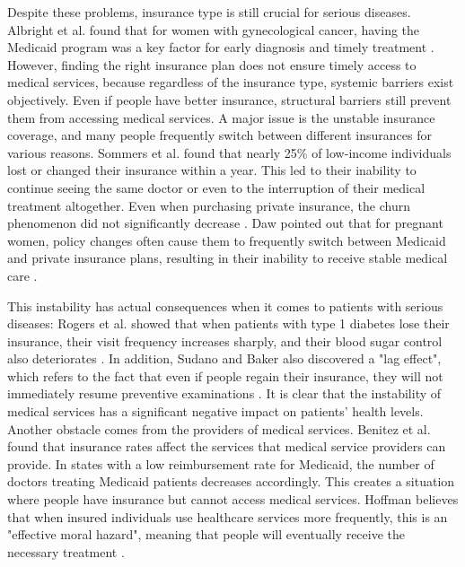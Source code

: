 Despite these problems, insurance type is still crucial for serious diseases. Albright et al. found that for women with gynecological cancer, having the Medicaid program was a key factor for early diagnosis and timely treatment \cite{Albright_Nasioudis_Craig_Moss_Latif_Ko_Haggerty_2021}. However, finding the right insurance plan does not ensure timely access to medical services, because regardless of the insurance type, systemic barriers exist objectively. Even if people have better insurance, structural barriers still prevent them from accessing medical services. A major issue is the unstable insurance coverage, and many people frequently switch between different insurances for various reasons. Sommers et al. found that nearly 25\% of low-income individuals lost or changed their insurance within a year. This led to their inability to continue seeing the same doctor or even to the interruption of their medical treatment altogether. Even when purchasing private insurance, the churn phenomenon did not significantly decrease \cite{Sommers_Gourevitch_Maylone_Blendon_Epstein_2016a}. Daw pointed out that for pregnant women, policy changes often cause them to frequently switch between Medicaid and private insurance plans, resulting in their inability to receive stable medical care \cite{Daw_Winkelman_Dalton_Kozhimannil_Admon_2020}.

This instability has actual consequences when it comes to patients with serious diseases: Rogers et al. showed that when patients with type 1 diabetes lose their insurance, their visit frequency increases sharply, and their blood sugar control also deteriorates \cite{Rogers_Lee_Tipirneni_Banerjee_Kim_2018}. In addition, Sudano and Baker also discovered a "lag effect", which refers to the fact that even if people regain their insurance, they will not immediately resume preventive examinations \cite{Sudano_Baker_2003}. It is clear that the instability of medical services has a significant negative impact on patients' health levels. Another obstacle comes from the providers of medical services. Benitez et al. found that insurance rates affect the services that medical service providers can provide. In states with a low reimbursement rate for Medicaid, the number of doctors treating Medicaid patients decreases accordingly. This creates a situation where people have insurance but cannot access medical services. Hoffman believes that when insured individuals use healthcare services more frequently, this is an "effective moral hazard", meaning that people will eventually receive the necessary treatment \cite{Hoffman2015Cost}.

